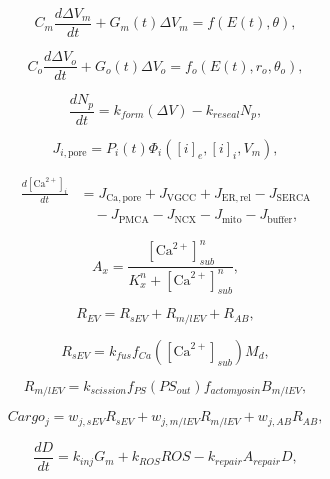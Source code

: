 \begin{equation}
C_m\frac{d\Delta V_m}{dt}+G_m(t)\Delta V_m=f(E(t),\theta),
\end{equation}

\begin{equation}
C_o\frac{d\Delta V_o}{dt}+G_o(t)\Delta V_o=f_o(E(t),r_o,\theta_o),
\end{equation}

\begin{equation}
\frac{dN_p}{dt}=k_{form}(\Delta V)-k_{reseal}N_p,
\end{equation}

\begin{equation}
J_{i,\mathrm{pore}}=P_i(t)\Phi_i([i]_e,[i]_i,V_m),
\end{equation}

\begin{equation}
\begin{aligned}
\frac{d[\mathrm{Ca}^{2+}]_i}{dt} &=
J_{\mathrm{Ca,pore}}+J_{\mathrm{VGCC}}+J_{\mathrm{ER,rel}}
-J_{\mathrm{SERCA}} \\
&\quad -J_{\mathrm{PMCA}}-J_{\mathrm{NCX}}-J_{\mathrm{mito}}-J_{\mathrm{buffer}},
\end{aligned}
\end{equation}

\begin{equation}
A_x=\frac{[\mathrm{Ca}^{2+}]_{sub}^n}{K_x^n+[\mathrm{Ca}^{2+}]_{sub}^n},
\end{equation}

\begin{equation}
R_{EV}=R_{sEV}+R_{m/lEV}+R_{AB},
\end{equation}

\begin{equation}
R_{sEV}=k_{fus}f_{Ca}([\mathrm{Ca}^{2+}]_{sub})M_d,
\end{equation}

\begin{equation}
R_{m/lEV}=k_{scission}f_{PS}(PS_{out})f_{actomyosin}B_{m/lEV},
\end{equation}

\begin{equation}
Cargo_j=w_{j,sEV}R_{sEV}+w_{j,m/lEV}R_{m/lEV}+w_{j,AB}R_{AB},
\end{equation}

\begin{equation}
\frac{dD}{dt}=k_{inj}G_m+k_{ROS}ROS-k_{repair}A_{repair}D,
\end{equation}

